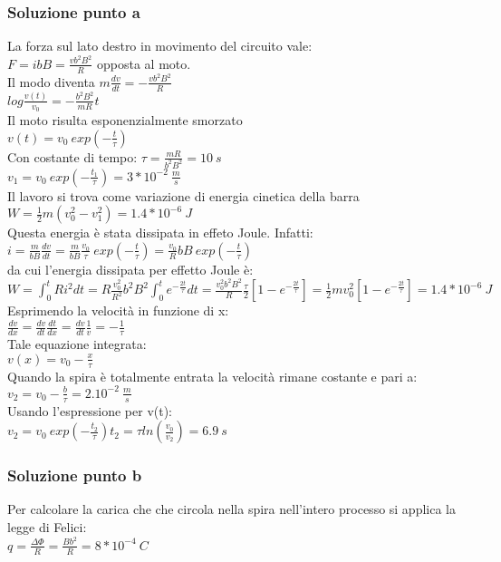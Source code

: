 \documentclass[../../main.tex]{subfiles}
\begin{document}
\subsubsection*{Soluzione punto a}
La forza sul lato destro in movimento del circuito vale:\\
$F =i b B = \frac{vb^2B^2}{R}$ opposta al moto.\\
Il modo diventa $m\frac{dv}{dt}=-\frac{vb^2B^2}{R}$\\
$log\frac{v(t)}{v_0}=-\frac{b^2B^2}{mR}t$\\
Il moto risulta esponenzialmente smorzato\\
$v(t) = v_0\ exp(-\frac{t}{\tau})$\\
Con costante di tempo: $\tau = \frac{mR}{b^2B^2} = 10\ s$\\
$v_1 = v_0\ exp(-\frac{t_1}{\tau}) = 3 * 10^{-2}\ \frac{m}{s}$\\
Il lavoro si trova come variazione di energia cinetica della barra\\
$W = \frac{1}{2}m\left(v_0^2-v_1^2\right) = 1.4 * 10^{-6}\ J$\\
Questa energia è stata dissipata in effeto Joule. Infatti:\\
$i = \frac{m}{bB}\frac{dv}{dt} = \frac{m}{bB}\frac{v_0}{\tau}\ exp\left(-\frac{t}{\tau}\right) = \frac{v_0}{R}bB\ exp\left(-\frac{t}{\tau}\right)$\\
da cui l'energia dissipata per effetto Joule è:\\
$W = \int_0^tRi^2dt = R\frac{v_0^2}{R^2}b^2B^2\int_0^te^{-\frac{2t}{\tau}} dt = \frac{v_0^2b^2B^2}{R}\frac{\tau}{2}\left[1- e^{-\frac{2t}{\tau}}\right] = \frac{1}{2}mv_0^2\left[1-e^{-\frac{2t}{\tau}}\right] = 1.4 * 10^{-6}\ J$\\
Esprimendo la velocità in funzione di x:\\
$\frac{dv}{dx} = \frac{dv}{dt}\frac{dt}{dx} = \frac{dv}{dt}\frac{1}{v} = -\frac{1}{\tau}$\\
Tale equazione integrata:\\
$v(x) = v_0 - \frac{x}{\tau}$\\
Quando la spira è totalmente entrata la velocità rimane costante e pari a:\\
$v_2 = v_0 - \frac{b}{\tau} = 2.10^{-2}\ \frac{m}{s}$\\
Usando l'espressione per v(t):\\
$v_2 = v_0\ exp\left(-\frac{t_2}{\tau}\right)$\tab$t_2 = \tau ln\left(\frac{v_0}{v_2}\right) = 6.9\ s$\\
\subsubsection*{Soluzione punto b}
Per calcolare la carica che che circola nella spira nell'intero processo si applica la legge di Felici:\\
$q = \frac{\Delta\Phi}{R} = \frac{Bb^2}{R} = 8 * 10 ^{-4}\ C$
\newpage
\end{document}
